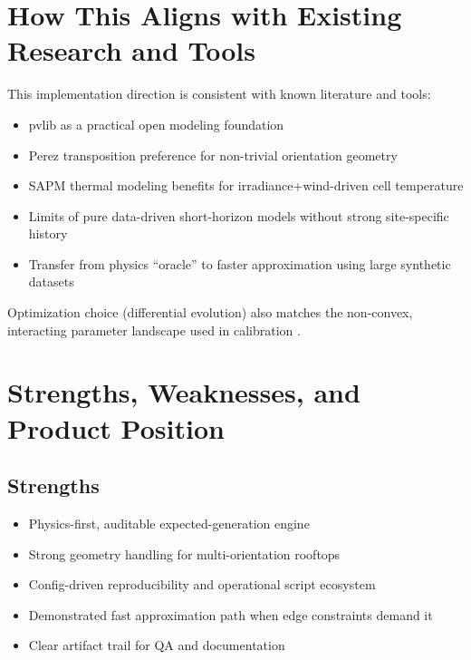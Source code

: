 \documentclass[11pt,a4paper]{article}
\begin{document}
\section{How This Aligns with Existing Research and Tools}

This implementation direction is consistent with known literature and tools:
\begin{itemize}
  \item pvlib as a practical open modeling foundation \cite{holmgren2018pvlib}
  \item Perez transposition preference for non-trivial orientation geometry \cite{perez1990set,gueymard2009direct}
  \item SAPM thermal modeling benefits for irradiance+wind-driven cell temperature \cite{king2004photovoltaic}
  \item Limits of pure data-driven short-horizon models without strong site-specific history \cite{diagne2013review,mellit2010artificial}
  \item Transfer from physics ``oracle'' to faster approximation using large synthetic datasets \cite{inman2013solar,tobin2017domain}
\end{itemize}

Optimization choice (differential evolution) also matches the non-convex, interacting parameter landscape used in calibration \cite{storn1997differential}.

\section{Strengths, Weaknesses, and Product Position}

\subsection{Strengths}
\begin{itemize}
  \item Physics-first, auditable expected-generation engine
  \item Strong geometry handling for multi-orientation rooftops
  \item Config-driven reproducibility and operational script ecosystem
  \item Demonstrated fast approximation path when edge constraints demand it
  \item Clear artifact trail for QA and documentation
\end{itemize}
\end{document}
